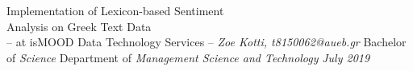 \documentclass[dvips, letterpaper,12pt]{report}
\begin{document}
\sloppy


\thesistitle
	{Implementation of Lexicon-based Sentiment \\
	\vspace{3mm}
	 Analysis on Greek Text Data \\
	\vspace{1cm}
	 -- at isMOOD Data Technology Services --}
	{\emph{Zoe Kotti, t8150062@aueb.gr}}
	{Bachelor of \emph{Science}}
	{Department of \emph{Management Science and Technology}}
	{\emph{July 2019}}




\tableofcontents













\appendix

\end{document}
